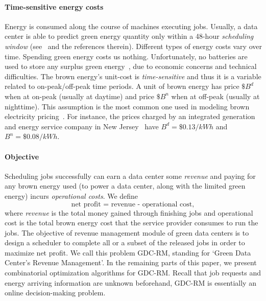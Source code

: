 \documentclass[conference]{IEEEtran}
\begin{document}
\paragraph*{Time-sensitive energy costs}

Energy is consumed along the course of machines executing jobs. Usually, a data center is able to predict green energy quantity only within a 48-hour \emph{scheduling window} (see~\cite{GoiriL11} and the references therein). Different types of energy costs vary over time. Spending green energy costs us nothing. Unfortunately, no batteries are used to store any surplus green energy~\cite{Bianchini12}, due to economic concerns and technical difficulties. The brown energy's unit-cost is \emph{time-sensitive} and thus it is a variable related to on-peak/off-peak time periods. A unit of brown energy has price $\$B^d$ when at on-peak (usually at daytime) and price $\$B^n$ when at off-peak (usually at nighttime). This assumption is the most common one used in modeling brown electricity pricing~\cite{GoiriL11}. For instance, the prices charged by an integrated generation and energy service company in New Jersey~\cite{GoiriL11} have $B^d = \$0.13/kWh$ and $B^n = \$0.08/kWh$.

\paragraph*{Objective}

Scheduling jobs successfully can earn a data center some \emph{revenue} and paying for any brown energy used (to power a data center, along with the limited green energy) incurs \emph{operational costs}. We define
\begin{displaymath}
\mbox{net profit = revenue - operational cost},
\end{displaymath}
where \emph{revenue} is the total money gained through finishing jobs and operational cost is the total brown energy cost that the service provider consumes to run the jobs. The objective of revenue management module of green data centers is to design a scheduler to complete all or a subset of the released jobs in order to maximize net profit. We call this problem GDC-RM, standing for `Green Data Center's Revenue Management'. In the remaining parts of this paper, we present combinatorial optimization algorithms for GDC-RM. Recall that job requests and energy arriving information are unknown beforehand, GDC-RM is essentially an online decision-making problem.
\end{document}
